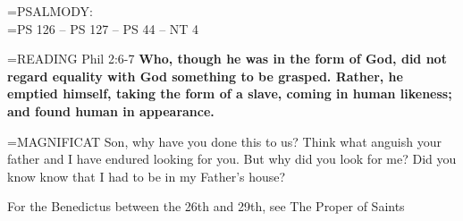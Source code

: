 \hangindent=\parindent \small{PSALMODY:}\\
\hangindent=\parindent  PS 126 -- PS 127 -- PS 44 -- NT 4\vspace{0.5em}

\hangindent=\parindent \small{\uppercase{READING}}    Phil 2:6-7 \textbf{   Who, though he was in the form of God, did not regard equality with God something to be grasped. Rather, he emptied himself, taking the form of a slave, coming in human likeness; and found human in appearance.\\}

\hangindent=\parindent \small{MAGNIFICAT 	Son, why have you done this to us? Think what anguish your father and I have endured looking for you. But why did you look for me? Did you know know that I had to be in my Father's house?\\}

For the Benedictus between the 26th and 29th, see The Proper of Saints
